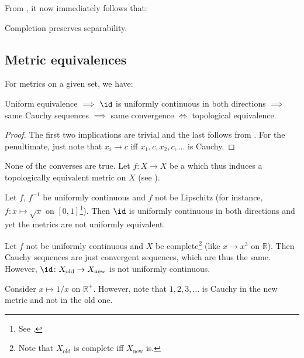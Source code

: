 	
	From , it now immediately follows that:
	
	\begin{cor}
		Completion preserves separability.
	\end{cor}
	
	
\subsection{Metric equivalences}

	\begin{prp}
		For metrics on a given set, we have:
		\begin{center}
			Uniform equivalence $\implies$ $\id$ is uniformly continuous in both directions $\implies$ same Cauchy sequences $\implies$ same convergence $\iff$ topological equivalence.
		\end{center}
	\end{prp}
	
	\begin{proof}
		The first two implications are trivial and the last follows from . For the penultimate, just note that $x_i\to c$ iff $x_1, c, x_2, c, \ldots$ is Cauchy.
	\end{proof}
	
	\begin{rmk}
		None of the converses are true. Let $f\colon X\to X$ be a \homeo which thus induces a topologically equivalent metric on $X$ (see ).
		\begin{mylist}
			\item Let $f$, $f^{-1}$ be uniformly continuous and $f$ not be Lipschitz (for instance, $f\colon x\mapsto \sqrt x$ on $[0, 1]$\footnote{
				See .
				}).
			Then $\id$ is uniformly continuous in both directions and yet the metrics are not uniformly equivalent.
			
			\item Let $f$ not be uniformly continuous and $X$ be complete\footnote{
				Note that $X_\text{old}$ is complete iff $X_\text{new}$ is.
				}
			(like $x\to x^3$ on $\mathbb R$). Then Cauchy sequences are just convergent sequences, which are thus the same. However, $\id\colon X_\text{old}\to X_\text{new}$ is not uniformly continuous.
			
			\item Consider $x\mapsto 1/x$ on $\mathbb R^+$. However, note that $1, 2, 3, \ldots$ is Cauchy in the new metric and not in the old one.
		\end{mylist}
	\end{rmk}
	
